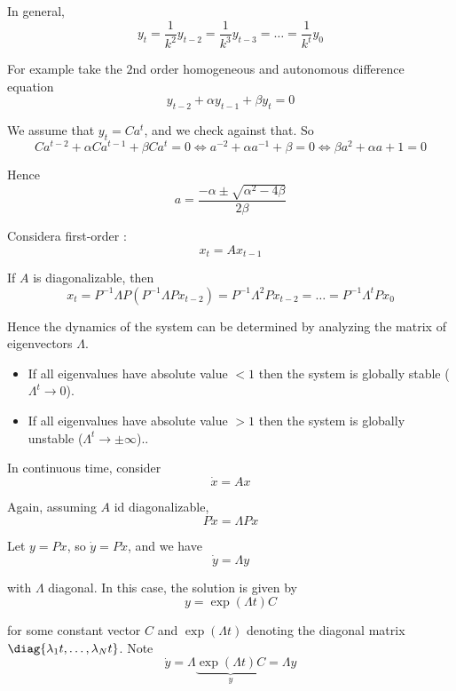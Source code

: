 \documentclass{article}
\begin{document}
In general,
\[
  y_t
  = \dfrac{1}{k^2} y_{t - 2}
  = \dfrac{1}{k^3} y_{t - 3}
  = \ldots
  = \dfrac{1}{k^t} y_{0}
\]

For example take the $2$nd order homogeneous and autonomous difference equation
\[
  y_{t - 2} + \alpha y_{t - 1} + \beta y_{t} = 0
\]

We assume that $y_t = Ca^t$, and we check against that. So
\[
  Ca^{t - 2}
  + \alpha Ca^{t - 1}
  + \beta Ca^{t}
  = 0
  \iff
  a^{-2}
  + \alpha a^{-1}
  + \beta
  = 0
  \iff
  \beta a^2 + \alpha a + 1 = 0
\]

Hence
\[
  a = \dfrac{-\alpha \pm \sqrt{\alpha^2 - 4\beta}}{2\beta}
\]

Considera first-order : 
\[
  x_t = A x_{t - 1}
\]

If $A$ is diagonalizable, then
\[
  x_t
  = P^{-1} \Lambda P \left(P^{-1} \Lambda P x_{t - 2}\right)
  = P^{-1} \Lambda^2 P x_{t - 2}
  = \ldots
  = P^{-1} \Lambda^t P x_{0}
\]

Hence the dynamics of the system can be determined by analyzing the matrix of eigenvectors $\Lambda$.
\begin{itemize}[label=$\bullet$]
  \item If all eigenvalues have absolute value $< 1$ then the system is globally stable ($\Lambda^t \to 0$).

  \item If all eigenvalues have absolute value $> 1$ then the system is globally unstable ($\Lambda^t \to \pm \infty$)..
\end{itemize}

In continuous time, consider
\[
  \dot{x} = A x
\]

Again, assuming $A$ id diagonalizable,
\[
  P \dot{x} = \Lambda P x
\]

Let $y = P x$, so $\dot{y} = P \dot{x}$, and we have
\[
  \dot{y} = \Lambda y
\]

with $\Lambda$ diagonal. In this case, the solution is given by
\[
  y = \exp(\Lambda t) C
\]

for some constant vector $C$ and $\exp(\Lambda t)$ denoting the diagonal matrix $\diag{\lambda_1 t, \ldots, \lambda_N t}$. Note
\[
  \dot{y}
  =
  \Lambda
  \underbrace{\exp(\Lambda t) C}_y
  =
  \Lambda y
\]
\end{document}
